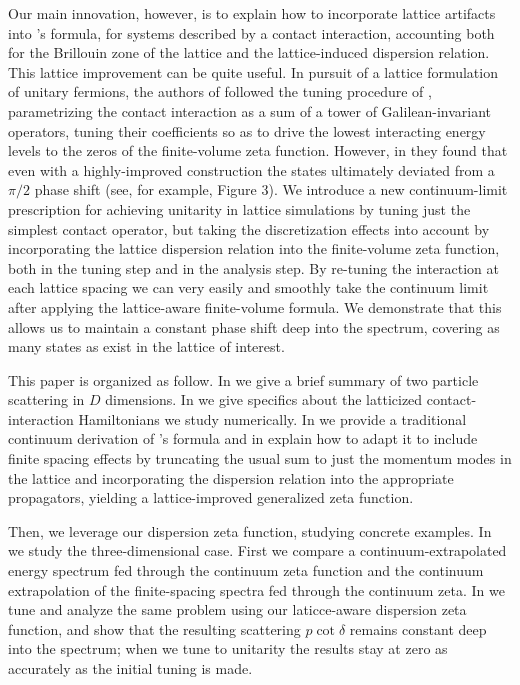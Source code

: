 Our main innovation, however, is to explain how to incorporate lattice artifacts into \Luscher's formula, for systems described by a contact interaction, accounting both for the Brillouin zone of the lattice and the lattice-induced dispersion relation.
This lattice improvement can be quite useful.
In pursuit of a lattice formulation of unitary fermions, the authors of  followed the tuning procedure of , parametrizing the contact interaction as a sum of a tower of Galilean-invariant operators, tuning their coefficients so as to drive the lowest interacting energy levels to the zeros of the \Luscher finite-volume zeta function.
However, in  they found that even with a highly-improved construction the states ultimately deviated from a $\pi/2$ phase shift (see, for example, Figure 3).
We introduce a new continuum-limit prescription for achieving unitarity in lattice simulations by tuning just the simplest contact operator, but taking the discretization effects into account by incorporating the lattice dispersion relation into the finite-volume zeta function, both in the tuning step and in the analysis step.
By re-tuning the interaction at each lattice spacing we can very easily and smoothly take the continuum limit after applying the lattice-aware finite-volume formula.
We demonstrate that this allows us to maintain a constant phase shift deep into the spectrum, covering as many \Aoneg states as exist in the lattice of interest.

This paper is organized as follow.  In  we give a brief summary of two particle scattering in $D$ dimensions.
In  we give specifics about the latticized contact-interaction Hamiltonians we study numerically.
In  we provide a traditional continuum derivation of \Luscher's formula and in  explain how to adapt it to include finite spacing effects by truncating the usual sum to just the momentum modes in the lattice and incorporating the dispersion relation into the appropriate propagators, yielding a lattice-improved generalized \Luscher zeta function.

Then, we leverage our dispersion zeta function, studying concrete examples.
In  we study the three-dimensional case.
First we compare a continuum-extrapolated energy spectrum fed through the continuum zeta function and the continuum extrapolation of the finite-spacing spectra fed through the continuum zeta.
In  we tune and analyze the same problem using our laticce-aware dispersion zeta function, and show that the resulting scattering $p\cot\delta$ remains constant deep into the spectrum; when we tune to unitarity the results stay at zero as accurately as the initial tuning is made.

